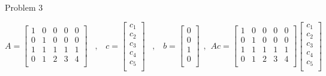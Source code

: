 \begin{problem}{Problem 3}
\begin{highlight}[Solution]
        \begin{equation}
            A = 
            \begin{bmatrix}
                1 & 0 & 0 & 0 & 0 \\
                0 & 1 & 0 & 0 & 0 \\
                1 & 1 & 1 & 1 & 1 \\
                0 & 1 & 2 & 3 & 4 \\
            \end{bmatrix}
            \hspace{10pt} , \hspace{10pt}
            c = 
            \begin{bmatrix}
                c_{1} \\
                c_{2} \\
                c_{3} \\
                c_{4} \\
                c_{5} \\
            \end{bmatrix}
            \hspace{10pt} , \hspace{10pt}
            b = 
            \begin{bmatrix}
                0 \\
                0 \\
                1 \\
                0 \\
            \end{bmatrix}
            \hspace{5pt} , \hspace{5pt}
            Ac = 
            \begin{bmatrix}
                1 & 0 & 0 & 0 & 0 \\
                0 & 1 & 0 & 0 & 0 \\
                1 & 1 & 1 & 1 & 1 \\
                0 & 1 & 2 & 3 & 4 \\
            \end{bmatrix}
            \begin{bmatrix}
                c_{1} \\
                c_{2} \\
                c_{3} \\
                c_{4} \\
                c_{5} \\

\end{bmatrix}
\end{equation}
\end{highlight}
\end{problem}
